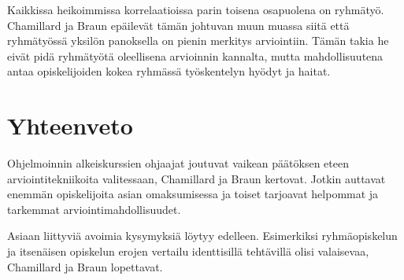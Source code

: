 \documentclass[finnish]{../tktltiki2}
\theoremstyle{definition}
\theoremstyle{remark}
\begin{document}
Kaikkissa heikoimmissa korrelaatioissa parin toisena osapuolena on ryhmätyö. Chamillard ja Braun epäilevät tämän johtuvan muun muassa siitä että ryhmätyössä yksilön panoksella on pienin merkitys arviointiin. Tämän takia he eivät pidä ryhmätyötä oleellisena arvioinnin kannalta, mutta mahdollisuutena antaa opiskelijoiden kokea ryhmässä työskentelyn hyödyt ja haitat.

\section{Yhteenveto}

Ohjelmoinnin alkeiskurssien ohjaajat joutuvat vaikean päätöksen eteen arviointitekniikoita valitessaan, Chamillard ja Braun kertovat. Jotkin auttavat enemmän opiskelijoita asian omaksumisessa ja toiset tarjoavat helpommat ja tarkemmat arviointimahdollisuudet.

Asiaan liittyviä avoimia kysymyksiä löytyy edelleen. Esimerkiksi ryhmäopiskelun ja itsenäisen opiskelun erojen vertailu identtisillä tehtävillä olisi valaisevaa, Chamillard ja Braun lopettavat.




\end{document}
